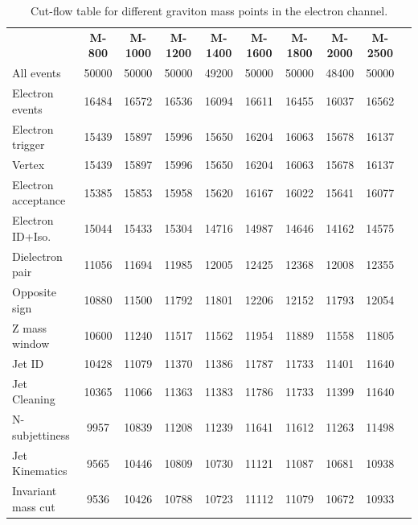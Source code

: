 \begin{landscape}
\begin{table}[p]
\begin{center}
\caption[Cut-flow table electron channel.]{Cut-flow table for different graviton mass points in the electron channel.}
\label{tab:cutFlowEl}
\begin{tabular}{lccccccccc}
\hline
	    &\textbf{M-800} &\textbf{M-1000} &\textbf{M-1200} &\textbf{M-1400} &\textbf{M-1600}  &\textbf{M-1800} &\textbf{M-2000} &\textbf{M-2500} \\ 
 All events          &   50000   &    50000  &    50000  &    49200  &    50000  &    50000  &    48400  &    50000 \\ 
 Electron events     &   16484   &    16572  &    16536  &    16094  &    16611  &    16455  &    16037  &    16562 \\ 
 Electron trigger    &   15439   &    15897  &    15996  &    15650  &    16204  &    16063  &    15678  &    16137 \\ 
 Vertex              &   15439   &    15897  &    15996  &    15650  &    16204  &    16063  &    15678  &    16137 \\ 
 Electron acceptance &   15385   &    15853  &    15958  &    15620  &    16167  &    16022  &    15641  &    16077 \\ 
 Electron ID+Iso.    &   15044   &    15433  &    15304  &    14716  &    14987  &    14646  &    14162  &    14575 \\ 
 Dielectron pair     &   11056   &    11694  &    11985  &    12005  &    12425  &    12368  &    12008  &    12355 \\ 
 Opposite sign       &   10880   &    11500  &    11792  &    11801  &    12206  &    12152  &    11793  &    12054 \\ 
 Z mass window       &   10600   &    11240  &    11517  &    11562  &    11954  &    11889  &    11558  &    11805 \\ 
 Jet ID              &   10428   &    11079  &    11370  &    11386  &    11787  &    11733  &    11401  &    11640 \\ 
 Jet Cleaning        &   10365   &    11066  &    11363  &    11383  &    11786  &    11733  &    11399  &    11640 \\ 
 N-subjettiness      &    9957   &    10839  &    11208  &    11239  &    11641  &    11612  &    11263  &    11498 \\ 
 Jet Kinematics      &    9565   &    10446  &    10809  &    10730  &    11121  &    11087  &    10681  &    10938 \\ 
 Invariant mass cut  &    9536   &    10426  &    10788  &    10723  &    11112  &    11079  &    10672  &    10933 \\ 
\hline
\end{tabular}
\end{center}
\end{table}
\end{landscape}


